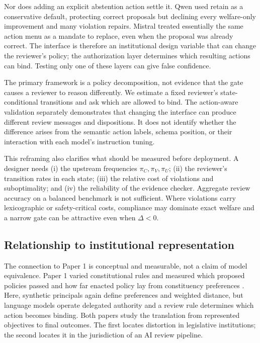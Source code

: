 \documentclass[10pt]{article}
\begin{document}
Nor does adding an explicit abstention action settle it. Qwen used retain as a
conservative default, protecting correct proposals but declining every
welfare-only improvement and many violation repairs. Mistral treated essentially
the same action menu as a mandate to replace, even when the proposal was already
correct. The interface is therefore an institutional design variable that can
change the reviewer's policy; the authorization layer determines which resulting
actions can bind. Testing only one of these layers can give false confidence.

The primary framework is a policy decomposition, not evidence that the gate
causes a reviewer to reason differently. We estimate a fixed reviewer's
state-conditional transitions and ask which are allowed to bind. The
action-aware validation separately demonstrates that changing the interface can
produce different review messages and dispositions. It does not identify whether
the difference arises from the semantic action labels, schema position, or their
interaction with each model's instruction tuning.

This reframing also clarifies what should be measured before deployment. A
designer needs (i) the upstream frequencies $\pi_C,\pi_V,\pi_U$; (ii) the
reviewer's transition rates in each state; (iii) the relative cost of violations
and suboptimality; and (iv) the reliability of the evidence checker. Aggregate
review accuracy on a balanced benchmark is not sufficient. Where violations
carry lexicographic or safety-critical costs, compliance may dominate exact
welfare and a narrow gate can be attractive even when $\Delta<0$.

\subsection{Relationship to institutional representation}

The connection to Paper 1 is conceptual and measurable, not a claim of model
equivalence. Paper 1 varied constitutional rules and measured which proposed
policies passed and how far enacted policy lay from constituency preferences
\cite{ali2026fragmented}. Here, synthetic principals again define preferences and
weighted distance, but language models operate delegated authority and a review
rule determines which action becomes binding. Both papers study the translation
from represented objectives to final outcomes. The first locates distortion in
legislative institutions; the second locates it in the jurisdiction of an AI
review pipeline.
\end{document}
